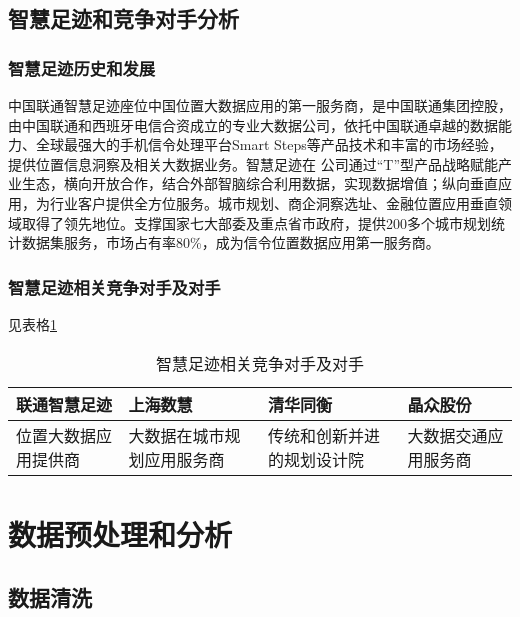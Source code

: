 \subsection{智慧足迹和竞争对手分析}
\subsubsection*{智慧足迹历史和发展}
中国联通智慧足迹座位中国位置大数据应用的第一服务商，是中国联通集团控股，由中国联通和西班牙电信合资成立的专业大数据公司，依托中国联通卓越的数据能力、全球最强大的手机信令处理平台Smart Steps等产品技术和丰富的市场经验，提供位置信息洞察及相关大数据业务。智慧足迹在
公司通过“T”型产品战略赋能产业生态，横向开放合作，结合外部智脑综合利用数据，实现数据增值；纵向垂直应用，为行业客户提供全方位服务。城市规划、商企洞察选址、金融位置应用垂直领域取得了领先地位。支撑国家七大部委及重点省市政府，提供200多个城市规划统计数据集服务，市场占有率80\%，成为信令位置数据应用第一服务商。
\subsubsection*{智慧足迹相关竞争对手及对手}
见表格\ref{tb:zhihuzuji}
\begin{table}
\label{tb:zhihuzuji}
\centering
\caption{智慧足迹相关竞争对手及对手}
\begin{tabular}{p{}|p{}|p{}|p{}}
\hline
\hline
联通智慧足迹 & 上海数慧 & 清华同衡 & 晶众股份\\
\hline
位置大数据应用提供商&大数据在城市规划应用服务商&传统和创新并进的规划设计院&大数据交通应用服务商\\
\hline
\hline
\end{tabular}
\end{table}
\section{数据预处理和分析}
\subsection{数据清洗}

